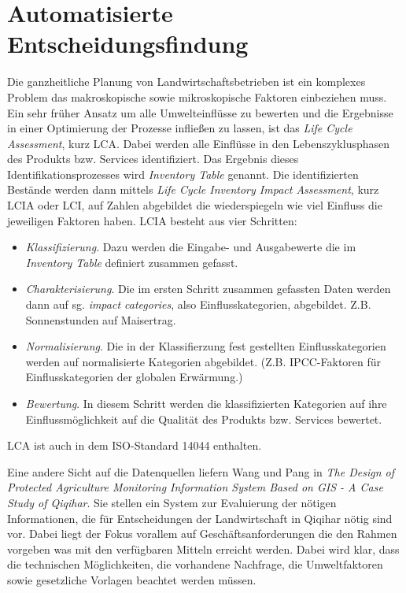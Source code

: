 \section{Automatisierte Entscheidungsfindung}

Die ganzheitliche Planung von Landwirtschaftsbetrieben ist ein komplexes Problem das makroskopische sowie mikroskopische Faktoren einbeziehen muss. Ein sehr früher Ansatz um alle Umwelteinflüsse zu bewerten und die Ergebnisse in einer Optimierung der Prozesse infließen zu lassen, ist das \textit{Life Cycle Assessment}, kurz LCA. Dabei werden alle Einflüsse in den Lebenszyklusphasen des Produkts bzw. Services identifiziert. Das Ergebnis dieses Identifikationsprozesses wird \textit{Inventory Table} genannt. Die identifizierten Bestände werden dann mittels \textit{Life Cycle Inventory Impact Assessment}, kurz LCIA oder LCI, auf Zahlen abgebildet die wiederspiegeln wie viel Einfluss die jeweiligen Faktoren haben. LCIA besteht aus vier Schritten:\cite{jour:Klopffer1997}

\begin{itemize}
	\item \textit{Klassifizierung}. Dazu werden die Eingabe- und Ausgabewerte die im \textit{Inventory Table} definiert zusammen gefasst.
	\item \textit{Charakterisierung}. Die im ersten Schritt zusammen gefassten Daten werden dann auf sg. \textit{impact categories}, also Einflusskategorien, abgebildet. Z.B. Sonnenstunden auf Maisertrag.
	\item \textit{Normalisierung}. Die in der Klassifierzung fest gestellten Einflusskategorien werden auf normalisierte Kategorien abgebildet. (Z.B. IPCC-Faktoren für Einflusskategorien der globalen Erwärmung.)
	\item \textit{Bewertung}. In diesem Schritt werden die klassifizierten Kategorien auf ihre Einflussmöglichkeit auf die Qualität des Produkts bzw. Services bewertet.
\end{itemize}

LCA ist auch in dem ISO-Standard 14044 enthalten.\cite{jour:Klopffer1997}

Eine andere Sicht auf die Datenquellen liefern Wang und Pang in \textit{The Design of Protected Agriculture Monitoring Information System
Based on GIS - A Case Study of Qiqihar}. Sie stellen ein System zur Evaluierung der nötigen Informationen, die für Entscheidungen der Landwirtschaft in Qiqihar nötig sind vor. Dabei liegt der Fokus vorallem auf Geschäftsanforderungen die den Rahmen vorgeben was mit den verfügbaren Mitteln erreicht werden. Dabei wird klar, dass die technischen Möglichkeiten, die vorhandene Nachfrage, die Umweltfaktoren sowie gesetzliche Vorlagen beachtet werden müssen. \cite{jour:Wang2013}

